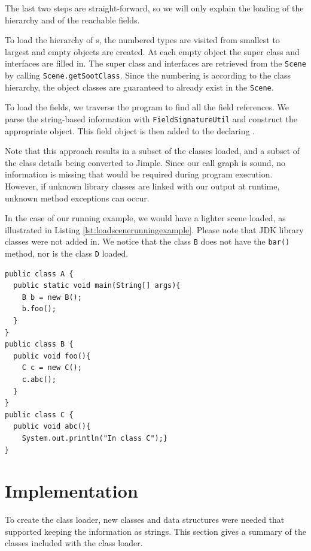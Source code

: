 \documentclass{sigplanconf}
\begin{document}
The last two steps are straight-forward, so we will only explain the loading of the hierarchy and of the reachable fields.

To load the hierarchy of {\sootclass}s, the numbered types are visited from smallest to largest and empty \sootclass objects are created. At each empty \sootclass object the super class and interfaces are filled in. The super class and interfaces are retrieved from the {\tt Scene} by calling {\tt Scene.getSootClass}. Since the numbering is according to the class hierarchy, the object classes are guaranteed to already exist in the {\tt Scene}.

To load the fields, we traverse the program to find all the field references. We parse the string-based information with
{\tt Field\-Signature\-Util} and construct the appropriate \sootfield object. This field object is then added to the declaring \sootclass.


Note that this approach results in a subset of the classes loaded, and a subset of the class details being converted to Jimple. Since our call graph is sound, no information is missing that would be required during program execution. However, if unknown library classes are linked with our output at runtime, unknown method exceptions can occur.

In the case of our running example, we would have a lighter scene loaded, as illustrated in Listing \ref{lst:loadscenerunningexample}. Please note that JDK library classes were not added in. We notice that the class {\tt B} does not have the {\tt bar()} method, nor is the class {\tt D} loaded.

\begin{lstlisting}[caption={Loaded Scene for Running example},label={lst:loadscenerunningexample},float=!ht]
public class A {
  public static void main(String[] args){
    B b = new B();
    b.foo();
  }
}
public class B {
  public void foo(){
    C c = new C();
    c.abc();
  }
}
public class C {
  public void abc(){
    System.out.println("In class C");}
}
\end{lstlisting}

\section{Implementation} %
\label{sec:api}
To create the \rb class loader, new classes and data structures were needed that supported keeping the information as strings. This section gives a summary of the classes included with the \rb class loader.
\end{document}
